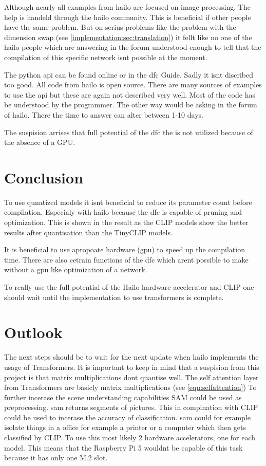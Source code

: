 Although nearly all examples from hailo are focused on image processing.
The help is handeld through the hailo community.
This is beneficial if other people have the same problem.
But on serius problems like the problem with the dimension swap (see \cref{implementation:sec:translation}) it fellt like no one of the hailo people which are answering in the forum understood enough to tell that the compilation of this specific network isnt possible at the moment.

The python \acrfull{api} can be found online or in the \acrshort{dfc} Guide.
Sadly it isnt discribed too good.
All code from hailo is open source.
There are many sources of examples to use the \acrshort{api} but these are again not described very well.
Most of the code has be understood by the programmer.
The other way would be asking in the forum of hailo.
There the time to answer can alter between 1-10 days.

The suspision arrises that full potential  of the \acrshort{dfc} the is not utilized because of the absence of a GPU.


\section{Conclusion}

To use qunatized models it isnt beneficial to reduce its parameter count before compilation.
Especialy with hailo because the \acrshort{dfc} is capable of pruning and optimization.
This is shown in the result as the CLIP models show the better results after quantisation than the TinyCLIP models.

It is beneficial to use apropoate hardware (\acrshort{gpu}) to speed up the compilation time.
There are also cetrain functions of the \acrshort{dfc} which arent possible to make without a \acrshort{gpu} like optimization of a network.

To really use the full potential of the Hailo hardware accelerator and CLIP one should wait until the implementation to use transformers is complete. 

\section{Outlook}

The next steps should be to wait for the next update when hailo implements the usage of Transformers.
It is important to keep in mind that a suspision from this project is that matrix multiplications dont quantise well.
The self attention layer from Transformers are basicly matrix multiplications (see \cref{equ:selfattention})
To further incerase the scene understanding capabilities SAM\cite{sam} could be used as preprocessing.
\acrshort{sam} returns segments of pictures.
This in compination with CLIP could be used to incerase the accuracy of classification.
\acrshort{sam} could for example isolate things in a office for example a printer or a computer which then gets classified by CLIP.
To use this most likely 2 hardware accelerators, one for each model.
This means that the Raspberry Pi 5 wouldnt be capable of this task because it has only one M.2 slot.

